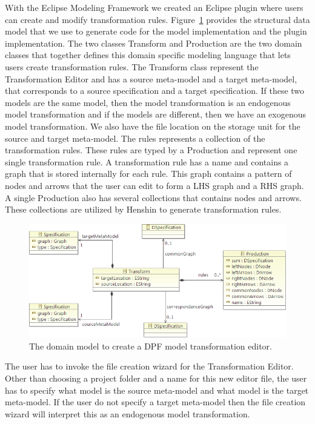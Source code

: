 With the Eclipse Modeling Framework we created an Eclipse plugin where users can
create and modify transformation rules. Figure~\ref{fig:transform_metamodel}
provides the structural data model that we use to generate code for the model
implementation and the plugin implementation. The two classes Transform and
Production are the two domain classes that together defines this domain specific
modeling language that lets users create transformation rules. The Transform
class represent the Transformation Editor and has a source meta-model and a
target meta-model, that corresponds to a source specification and a target
specification. If these two models are the same model, then the model
transformation is an endogenous model transformation and if the models are
different, then we have an exogenous model transformation. We also have the file
location on the storage unit for the source and target meta-model. The rules
represents a collection of the transformation rules. These rules are typed by a
Production and represent one single transformation rule. A transformation
rule has a name and contains a graph that is stored internally for each rule.
This graph contains a pattern of nodes and arrows that the user can edit to
form a LHS graph and a RHS graph. A single Production also has several
collections that contains nodes and arrows. These collections are utilized by
Henshin to generate transformation rules. 

\begin{figure}[H]
	\centering
	\includegraphics[scale=0.8]{./Figures/transform_metamodel_ecore.png}
	\caption[Model for the Transformation Editor]
	{The domain model to create a DPF model transformation editor.}
	\label{fig:transform_metamodel}
\end{figure}

The user has to invoke the file creation wizard for the Transformation Editor.
Other than choosing a project folder and a name for this new editor file, the
user has to specify what model is the source meta-model and what model is the
target meta-model. If the user do not specify a target meta-model then the file
creation wizard will interpret this as an endogenous model transformation.

